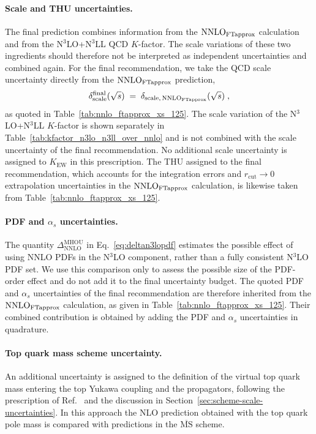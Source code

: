 \paragraph{Scale and THU uncertainties.}
The final prediction combines information from the $\textup{NNLO}_{\textup{FTapprox}}$ calculation and from the N$^3$LO+N$^3$LL QCD $K$-factor. The scale variations of these two ingredients should therefore not be interpreted as independent uncertainties and combined again. For the final recommendation, we take the QCD scale uncertainty directly from the $\textup{NNLO}_{\textup{FTapprox}}$ prediction,
\begin{equation}
\delta_\mathrm{scale}^\mathrm{final}(\sqrt{s}) \;=\; \delta_{\mathrm{scale},\,\textup{NNLO}_{\textup{FTapprox}}}(\sqrt{s}) \;,
\end{equation}
as quoted in Table~\ref{tab:nnlo_ftapprox_xs_125}. The scale variation of the N$^3$LO+N$^3$LL $K$-factor is shown separately in Table~\ref{tab:kfactor_n3lo_n3ll_over_nnlo} and is not combined with the scale uncertainty of the final recommendation. No additional scale uncertainty is assigned to $K_\mathrm{EW}$ in this prescription. The THU assigned to the final recommendation, which accounts for the integration errors and $r_\mathrm{cut}\to0$ extrapolation uncertainties in the $\textup{NNLO}_{\textup{FTapprox}}$ calculation, is likewise taken from Table~\ref{tab:nnlo_ftapprox_xs_125}.

\paragraph{PDF and $\alpha_s$ uncertainties.}
The quantity $\Delta^{\mathrm{MHOU}}_\mathrm{NNLO}$ in Eq.~\eqref{eq:deltan3lopdf} estimates the possible effect of using NNLO PDFs in the N$^3$LO component, rather than a fully consistent N$^3$LO PDF set. We use this comparison only to assess the possible size of the PDF-order effect and do not add it to the final uncertainty budget. The quoted PDF and $\alpha_s$ uncertainties of the final recommendation are therefore inherited from the $\textup{NNLO}_{\textup{FTapprox}}$ calculation, as given in Table~\ref{tab:nnlo_ftapprox_xs_125}. Their combined contribution is obtained by adding the PDF and $\alpha_s$ uncertainties in quadrature.

\paragraph{Top quark mass scheme uncertainty.}
An additional uncertainty is assigned to the definition of the virtual top quark mass entering the top Yukawa coupling and the propagators, following the prescription of Ref.~\cite{Baglio:2020wgt} and the discussion in Section~\ref{sec:scheme-scale-uncertainties}. In this approach the NLO prediction obtained with the top quark pole mass is compared with predictions in the $\overline{\mathrm{MS}}$ scheme.

